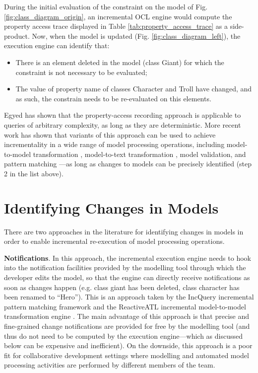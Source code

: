 During the initial evaluation of the constraint on the model of Fig. \ref{fig:class_diagram_origin}, an incremental OCL engine would compute the property access trace displayed in Table \ref{tab:property_access_trace} as a side-product. Now, when the model is updated (Fig. \ref{fig:class_diagram_left}), the execution engine can identify that:

\begin{itemize}
  \item There is an element deleted in the model (class \textsf{Giant}) for which the constraint is not necessary to be evaluated;
  \item The value of property \textsf{name} of classes \textsf{Character} and \textsf{Troll} have changed, and as such, the constrain needs to be re-evaluated on this elements.
\end{itemize}

Egyed has shown that the property-access recording approach is applicable to queries of arbitrary complexity, 
as long as they are deterministic. More recent work has shown that variants of this approach can be used to 
achieve incrementality in a wide range of model processing operations, including model-to-model 
transformation \cite{jouault2010towards}, model-to-text transformation \cite{DBLP:conf/ecmdafa/OgunyomiRK15}, 
model validation, and pattern matching \cite{DBLP:conf/ecmdafa/RathHV12}---as long as changes to models can be 
precisely identified (step 2 in the list above).

\section{Identifying Changes in Models}
\label{sec:identifying_changes_in models}
There are two approaches in the literature for identifying changes in models 
in order to enable incremental re-execution of model processing operations.

\textbf{Notifications}. In this approach, the incremental execution 
engine needs to hook into the notification facilities 
provided by the modelling tool through which the developer edits the model, 
so that the engine can directly receive notifications as soon as 
changes happen (e.g. class \textsf{giant} has been deleted, class \textsf{character} has been renamed to ``Hero''). 
This is an approach taken by the IncQuery incremental pattern matching 
framework \cite{DBLP:conf/ecmdafa/RathHV12} and the ReactiveATL incremental model-to-model 
transformation engine \cite{DBLP:conf/ecmdafa/OgunyomiRK15}. The main advantage of this 
approach is that precise and fine-grained change notifications are provided 
for free by the modelling tool (and thus do not need to be computed by the 
execution engine---which as discussed below can be expensive and inefficient). 
On the downside, this approach is a poor fit for collaborative development 
settings where modelling and automated model processing activities are 
performed by different members of the team.

